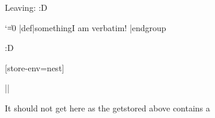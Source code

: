 \documentclass{article}
\begin{document}
\begin{scontents}[store-env=another]
Leaving:
\stop :D
\end{scontents}

\begin{scontents}[store-env=test]
\begingroup
  \catcode`\|=0
  |def|something{I am verbatim!}
|endgroup
\something
\end{scontents}

\begin{scontents}[store-env=test]
\hello :D
\end{scontents}

[store-env=nest]

\begin{scnest}
\def\nested{A}
\begin{scnest}
\def\nested{B}
\end{scnest}
\end{scnest}

\Scontents*{\abcde}
\Scontents*|\fghij|





\nested

\nested


It should not get here as the getstored above contains a \stop
\end{document}
